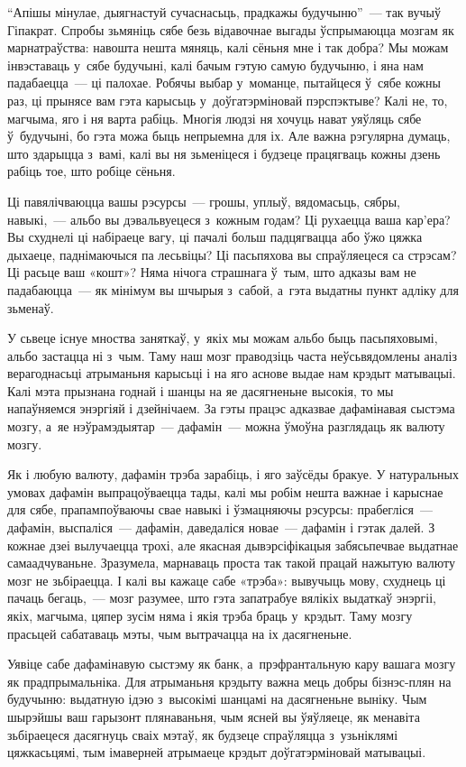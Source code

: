 ``Апішы мінулае, дыягнастуй сучаснасьць, прадкажы будучыню''~--- так вучыў Гіпакрат. Спробы зьмяніць сябе безь відавочнае выгады ўспрымаюцца мозгам як марнатраўства: навошта нешта мяняць, калі сёньня мне і так добра? Мы можам інвэставаць у~сябе будучыні, калі бачым гэтую самую будучыню, і яна нам падабаецца~--- ці палохае. Робячы выбар у~моманце, пытайцеся ў~сябе кожны раз, ці прынясе вам гэта карысьць у~доўгатэрміновай пэрспэктыве? Калі не, то, магчыма, яго і ня варта рабіць. Многія людзі ня хочуць нават уяўляць сябе ў~будучыні, бо гэта можа быць непрыемна для іх. Але важна рэгулярна думаць, што здарыцца з~вамі, калі вы ня зьменіцеся і будзеце працягваць кожны дзень рабіць тое, што робіце сёньня.

Ці павялічваюцца вашы рэсурсы~--- грошы, уплыў, вядомасьць, сябры, навыкі,~--- альбо вы дэвальвуецеся з~кожным годам? Ці рухаецца ваша кар'ера? Вы схуднелі ці набіраеце вагу, ці пачалі больш падцягвацца або ўжо цяжка дыхаеце, паднімаючыся па лесьвіцы? Ці пасьпяхова вы спраўляецеся са стрэсам? Ці расьце ваш «кошт»? Няма нічога страшнага ў~тым, што адказы вам не падабаюцца~--- як мінімум вы шчырыя з~сабой, а~гэта выдатны пункт адліку для зьменаў.

У сьвеце існуе мноства заняткаў, у~якіх мы можам альбо быць пасьпяховымі, альбо застацца ні з~чым. Таму наш мозг праводзіць часта неўсьвядомлены аналіз верагоднасьці атрыманьня карысьці і на яго аснове выдае нам крэдыт матывацыі. Калі мэта прызнана годнай і шанцы на яе дасягненьне высокія, то мы напаўняемся энэргіяй і дзейнічаем. За гэты працэс адказвае дафамінавая сыстэма мозгу, а~яе нэўрамэдыятар~--- дафамін~--- можна ўмоўна разглядаць як валюту мозгу.

Як і любую валюту, дафамін трэба зарабіць, і яго заўсёды бракуе. У натуральных умовах дафамін выпрацоўваецца тады, калі мы робім нешта важнае і карыснае для сябе, прапампоўваючы свае навыкі і ўзмацняючы рэсурсы: прабегліся~--- дафамін, выспаліся~--- дафамін, даведаліся новае~--- дафамін і гэтак далей. З кожнае дзеі вылучаецца трохі, але якасная дывэрсіфікацыя забясьпечвае выдатнае самаадчуваньне. Зразумела, марнаваць проста так такой працай нажытую валюту мозг не зьбіраецца. І калі вы кажаце сабе «трэба»: вывучыць мову, схуднець ці пачаць бегаць,~--- мозг разумее, што гэта запатрабуе вялікіх выдаткаў энэргіі, якіх, магчыма, цяпер зусім няма і якія трэба браць у~крэдыт. Таму мозгу прасьцей сабатаваць мэты, чым вытрачацца на іх дасягненьне.

Уявіце сабе дафамінавую сыстэму як банк, а~прэфрантальную кару вашага мозгу як прадпрымальніка. Для атрыманьня крэдыту важна мець добры бізнэс-плян на будучыню: выдатную ідэю з~высокімі шанцамі на дасягненьне выніку. Чым шырэйшы ваш гарызонт плянаваньня, чым ясней вы ўяўляеце, як менавіта зьбіраецеся дасягнуць сваіх мэтаў, як будзеце спраўляцца з~узьніклямі цяжкасьцямі, тым імаверней атрымаеце крэдыт доўгатэрміновай матывацыі.

